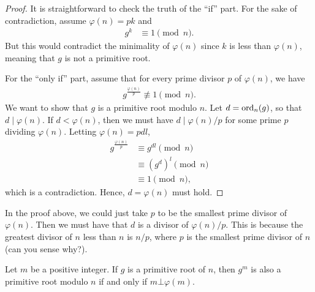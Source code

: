 \documentclass{subfile}
\begin{document}
	\begin{proof}
		It is straightforward to check the truth of the ``if'' part. For the sake of contradiction, assume $\varphi(n)=pk$ and
			\begin{align*}
				g^{k} & \equiv1\pmod n.
			\end{align*}
		But this would contradict the minimality of $\varphi(n)$ since $k$ is less than $\varphi(n)$, meaning that $g$ is not a primitive root.

		For the ``only if'' part, assume that for every prime divisor $p$ of $\varphi(n)$, we have
			\begin{align*}
				g^{\frac{\varphi(n)}{p}}\not\equiv1\pmod n.
			\end{align*}
		We want to show that $g$ is a primitive root modulo $n$. Let $d=\operatorname{ord}_n(g)$, so that $d \mid \varphi(n)$. If $d<\varphi(n)$, then we must have $d\mid {\varphi(n)}/{p}$ for some prime $p$ dividing $\varphi(n)$. Letting $\varphi(n)=pdl$,
			\begin{align*}
				g^{\frac{\varphi(n)}{p}}
					& \equiv g^{dl}\pmod{n}\\
					& \equiv \left(g^d\right)^l\pmod{n}\\
					& \equiv1\pmod n,
			\end{align*}
		which is a contradiction. Hence, $d=\varphi(n)$ must hold.
	\end{proof}

	\begin{note}
		In the proof above, we could just take $p$ to be the smallest prime divisor of $\varphi(n)$. Then we must have that $d$ is a divisor of ${\varphi(n)}/{p}$. This is because the greatest divisor of $n$ less than $n$ is ${n}/{p}$, where $p$ is the smallest prime divisor of $n$ (can you sense why?).
	\end{note}

	\begin{corollary}\label{cor:prpower}
		Let $m$ be a positive integer. If $g$ is a primitive root of $n$, then $g^m$ is also a primitive root modulo $n$ if and only if $m \bot \varphi(m)$.
	\end{corollary}
\end{document}
